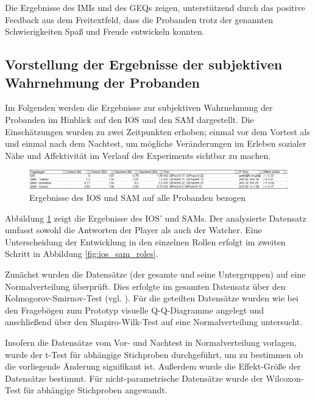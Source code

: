 Die Ergebnisse des \ac{IMI}s und des \ac{GEQ}s zeigen, unterstützend durch das positive Feedback aus dem Freitextfeld, dass die Probanden trotz der genannten Schwierigkeiten Spaß und Freude entwickeln konnten.

\subsection{Vorstellung der Ergebnisse der subjektiven Wahrnehmung der Probanden}
Im Folgenden werden die Ergebnisse zur subjektiven Wahrnehmung der Probanden im Hinblick auf den \ac{IOS} und den \ac{SAM} dargestellt. Die Einschätzungen wurden zu zwei Zeitpunkten erhoben; einmal vor dem Vortest als  und einmal nach dem Nachtest, um mögliche Veränderungen im Erleben sozialer Nähe und Affektivität im Verlauf des Experiments sichtbar zu machen.

\begin{figure}[ht]
\centering
\includegraphics[width=1\linewidth]{content/pictures/IOS_SAM_Overal.png}
\caption{Ergebnisse des \ac{IOS} und \ac{SAM} auf alle Probanden bezogen}
\label{fig:ios_sam_overal}
\end{figure}

Abbildung \ref{fig:ios_sam_overal} zeigt die Ergebnisse des \ac{IOS}' und \ac{SAM}s. Der analysierte Datensatz umfasst sowohl die Antworten der Player als auch der Watcher. Eine Unterscheidung der Entwicklung in den einzelnen Rollen erfolgt im zweiten Schritt in Abbildung \ref{fig:ios_sam_roles}.

Zunächst wurden die Datensätze (der gesamte und seine Untergruppen) auf eine Normalverteilung überprüft. Dies erfolgte im gesamten Datensatz über den  Kolmogorov-Smirnov-Test (vgl. \cite{massey_kolmogorov-smirnov_1951}). Für die geteilten Datensätze wurden wie bei den Fragebögen zum Prototyp visuelle \ac{Q-Q}-Diagramme angelegt und anschließend über den Shapiro-Wilk-Test auf eine Normalverteilung untersucht.

Insofern die Datensätze vom Vor- und Nachtest in Normalverteilung vorlagen, wurde der t-Test für abhängige Stichproben durchgeführt, um zu bestimmen ob die vorliegende Änderung signifikant ist. Außerdem wurde die Effekt-Größe der Datensätze bestimmt. Für nicht-parametrische Datensätze wurde der Wilcoxon-Test für abhängige Stichproben angewandt.

